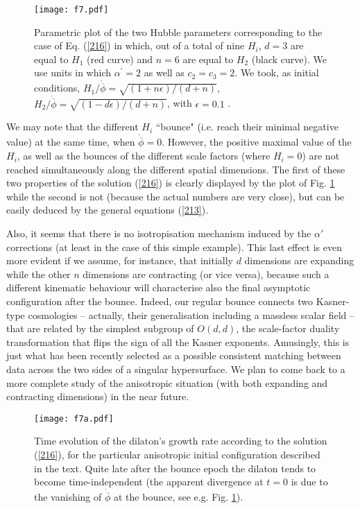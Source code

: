 \documentclass[a4paper,11pt]{article}
\def \ap {\alpha^{\prime}}
\def \fb {\overline \phi}
\def \fbp {\dot{\fb}}
\begin{document}
\begin{figure}[t]
\centering
\texttt{[image: f7.pdf]}
\caption{Parametric plot of the two Hubble parameters corresponding to the case of Eq. (\ref{216}) in which, out of a total of nine $H_i$, $d=3$ are equal to $H_1$ (red curve) and $n=6$ are equal to $H_2$ (black curve). We use units in which $\ap=2$ as well as $c_2 = c_3 =2$.  We took, as initial conditions,  ${H_1}/{\fbp} = \sqrt{(1 + n  \epsilon) /(d+n)}$, ${H_2}/{\fbp} =\sqrt{ (1 - d  \epsilon)/(d+n)}$, with $\epsilon = 0.1$ .}
\label{f7}
\end{figure} 

We may note that the different $H_i$ ``bounce" (i.e. reach their minimal negative value) at the same time, when $\fbp=0$. However,  the positive maximal value of the $H_i$, as well as the bounces of the different scale factors (where $H_i=0$) are not reached simultaneously along the different spatial dimensions. The first of these  two properties of the solution (\ref{216}) is clearly displayed by the plot of Fig. \ref{f7} while the second is not (because the actual numbers are very close), but  can be easily deduced by the general equations (\ref{213}). 

Also, it seems that there is no isotropisation mechanism induced by the $\alpha'$ corrections (at least in the case of this simple example). This last effect is even more evident if we assume, for instance, that initially $d$ dimensions are expanding while the other $n$ dimensions are contracting (or vice versa), because such a different kinematic behaviour will  characterise also the final asymptotic configuration after the bounce. Indeed, our regular bounce connects two Kasner-type cosmologies -- actually, their  generalisation including a massless scalar field --  that are related by the simplest subgroup of $O(d,d)$, the scale-factor duality transformation that flips the sign of all the Kasner exponents. Amusingly, this is just what has been recently selected as  a possible consistent matching \cite{LLV} between data across the two sides of a singular hypersurface. 
We plan to come back to a more complete study of the anisotropic situation (with both expanding and contracting dimensions) in the near future.

\begin{figure}[t]
\centering
\texttt{[image: f7a.pdf]}
\caption{Time evolution of the dilaton's  growth rate according to the solution  (\ref{216}), for the particular anisotropic initial configuration described in the text. Quite late after the bounce epoch the dilaton tends to become time-independent (the apparent divergence at $t=0$ is due to the vanishing of $\fbp$ at the bounce, see e.g. Fig. \ref{f7}).}
\label{f7a}
\end{figure} 
\end{document}
